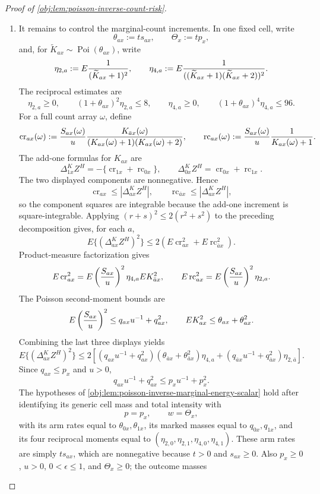 \documentclass[11pt]{article}
\begin{document}
\begin{proof}[Proof of \cref{obj:lem:poisson-inverse-count-risk}]
\begin{enumerate}
\item
It remains to control the marginal-count increments.  In one fixed cell, write
\[
\theta_{ax}:=ts_{ax},\qquad
\Theta_x:=tp_x,
\]
and, for \(\widetilde K_{ax}\sim\operatorname{Poi}(\theta_{ax})\), write
\[
\eta_{2,a}:=E{1\over (\widetilde K_{ax}+1)^2},\qquad
\eta_{4,a}:=E{1\over ((\widetilde K_{ax}+1)(\widetilde K_{ax}+2))^2}.
\]
The reciprocal estimates are
\[
\eta_{2,a}\ge0,
\qquad
(1+\theta_{ax})^2\eta_{2,a}\le8,
\qquad
\eta_{4,a}\ge0,
\qquad
(1+\theta_{ax})^4\eta_{4,a}\le96.
\]
For a full count array \(\omega\), define
\[
\operatorname{cr}_{ax}(\omega):=
{S_{ax}(\omega)\over u}{K_{\bar a x}(\omega)\over
(K_{ax}(\omega)+1)(K_{ax}(\omega)+2)},
\qquad
\operatorname{rc}_{ax}(\omega):=
{S_{ax}(\omega)\over u}{1\over K_{ax}(\omega)+1}.
\]
The add-one formulas for \(K_{ax}\) are
\[
\Delta^K_{1x}Z^H
=
-\{\operatorname{cr}_{1x}+\operatorname{rc}_{0x}\},
\qquad
\Delta^K_{0x}Z^H
=
\operatorname{cr}_{0x}+\operatorname{rc}_{1x}.
\]
The two displayed components are nonnegative.  Hence
\[
\operatorname{cr}_{ax}\le |\Delta^K_{ax}Z^H|,
\qquad
\operatorname{rc}_{\bar a x}\le |\Delta^K_{ax}Z^H|,
\]
so the component squares are integrable because the add-one increment is square-integrable.  Applying \((r+s)^2\le2(r^2+s^2)\) to the preceding decomposition gives, for each \(a\),
\[
E\{(\Delta^K_{ax}Z^H)^2\}
\le
2\left(E\operatorname{cr}_{ax}^2+E\operatorname{rc}_{\bar a x}^2\right).
\]
Product-measure factorization gives
\[
E\operatorname{cr}_{ax}^2
=
E\left({S_{ax}\over u}\right)^2
\eta_{4,a}
E K_{\bar a x}^2,
\qquad
E\operatorname{rc}_{ax}^2
=
E\left({S_{ax}\over u}\right)^2\eta_{2,a}.
\]
The Poisson second-moment bounds are
\[
E\left({S_{ax}\over u}\right)^2
\le q_{ax}u^{-1}+q_{ax}^2,
\qquad
E K_{ax}^2\le \theta_{ax}+\theta_{ax}^2.
\]
Combining the last three displays yields
\[
E\{(\Delta^K_{ax}Z^H)^2\}
\le
2\left[
(q_{ax}u^{-1}+q_{ax}^2)(\theta_{\bar a x}+\theta_{\bar a x}^2)\eta_{4,a}
+
(q_{\bar a x}u^{-1}+q_{\bar a x}^2)\eta_{2,\bar a}
\right].
\]
Since \(q_{ax}\le p_x\) and \(u>0\),
\[
q_{ax}u^{-1}+q_{ax}^2\le p_xu^{-1}+p_x^2.
\]
The hypotheses of \cref{obj:lem:poisson-inverse-marginal-energy-scalar} hold after identifying
its generic cell mass and total intensity with
\[
p=p_x,
\qquad
w=\Theta_x,
\]
with its arm rates equal to \(\theta_{0x},\theta_{1x}\), its marked masses equal to
\(q_{0x},q_{1x}\), and its four reciprocal moments equal to
\((\eta_{2,0},\eta_{2,1},\eta_{4,0},\eta_{4,1})\).  These arm rates are simply
\(t s_{ax}\), which are nonnegative because \(t>0\) and \(s_{ax}\ge0\).  Also
\(p_x\ge0\), \(u>0\), \(0<\epsilon\le1\), and \(\Theta_x\ge0\); the outcome masses

\end{enumerate}
\end{proof}
\end{document}
